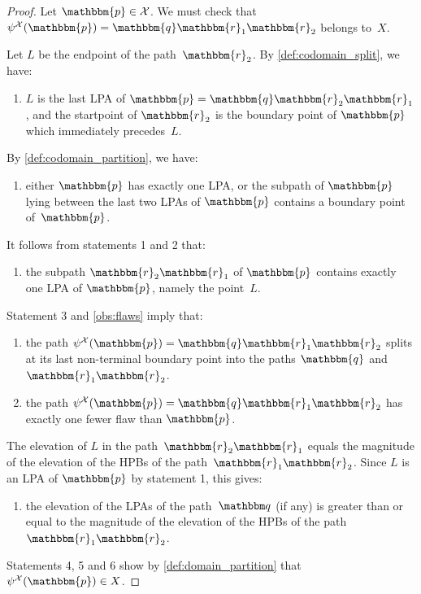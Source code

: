 \documentclass[10pt,a4paper]{amsart}
\begin{document}
\begin{proof}
    Let $\mathbbm{p} \in \mathcal{X}$.
    We must check that 
    $\psi^\mathcal X(\mathbbm{p}) = \mathbbm{q} \mathbbm{r}_1 \mathbbm{r}_2$ belongs to~$X$.

    Let $L$ be the endpoint of the path~$\mathbbm{r}_2$.
    By \cref{def:codomain_split}, we have:

    \begin{enumerate}
    \item[1.]
    $L$ is the last LPA of $\mathbbm{p}= \mathbbm{q} \mathbbm{r}_2 \mathbbm{r}_1$, and the startpoint of $\mathbbm{r}_2$ is the boundary point of $\mathbbm{p}$ which immediately precedes~$L$.
    \end{enumerate}
    
    By \cref{def:codomain_partition},  we have:

    \begin{enumerate}
    \item[2.]
    either $\mathbbm{p}$ has exactly one LPA,
    or the subpath of $\mathbbm{p}$ lying between the last two LPAs of $\mathbbm{p}$ contains a boundary point of~$\mathbbm{p}$.
    \end{enumerate}
    
    It follows from statements 1 and 2 that:

    \begin{enumerate}
    \item[3.]
    the subpath $\mathbbm{r}_2 \mathbbm{r}_1$ of $\mathbbm{p}$ contains exactly one LPA of $\mathbbm{p}$, namely the point~$L$.
    \end{enumerate}
    
    Statement 3 and \cref{obs:flaws} imply that:

    \begin{enumerate}
    \item[4.]
    the path $\psi^{\mathcal X}(\mathbbm{p}) = \mathbbm{q} \mathbbm{r}_1 \mathbbm{r}_2$ splits at its last non-terminal boundary point into the paths $\mathbbm{q}$ and~$\mathbbm{r}_1 \mathbbm{r}_2$.
    \item[5.]
    the path $\psi^\mathcal X(\mathbbm{p})= \mathbbm{q} \mathbbm{r}_1 \mathbbm{r}_2$ has exactly one fewer flaw than $\mathbbm{p}$.
    \end{enumerate}
    The elevation of $L$ in the path~$\mathbbm{r}_2 \mathbbm{r}_1$ equals the 
    magnitude of the elevation of the HPBs of the path~$\mathbbm{r}_1 \mathbbm{r}_2$. Since $L$ is an LPA of $\mathbbm{p}$ by statement 1, this gives:

    \begin{enumerate}
    \item[6.]
    the elevation of the LPAs of the path~$\mathbbm q$ (if any) is greater than or equal to the magnitude of the elevation of the HPBs of the path~$\mathbbm{r}_1 \mathbbm{r}_2$.
    \end{enumerate}
    
    Statements 4, 5 and 6 show by \cref{def:domain_partition} that $\psi^\mathcal X(\mathbbm{p}) \in X$.
\end{proof}
\end{document}
